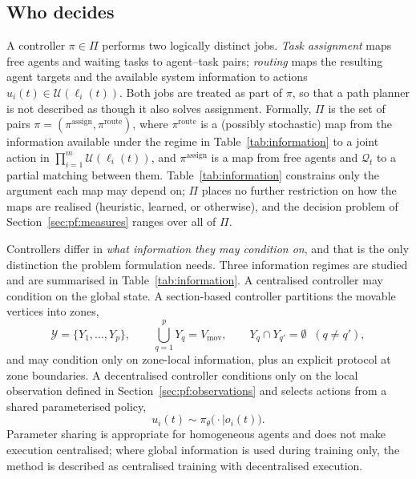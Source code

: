\documentclass[../main.tex]{subfiles}
\begin{document}
\subsection{Who decides}
\label{sec:pf:controllers}

A controller $\pi \in \Pi$ performs two logically distinct jobs. \emph{Task
assignment} maps free agents and waiting tasks to agent--task pairs; \emph{routing}
maps the resulting agent targets and the available system information to actions
$u_i(t) \in \mathcal{U}(\ell_i(t))$. Both jobs are treated as part of $\pi$, so
that a path planner is not described as though it also solves assignment.
Formally, $\Pi$ is the set of pairs %
$\pi = (\pi^{\mathrm{assign}}, \pi^{\mathrm{route}})$, where
$\pi^{\mathrm{route}}$ is a (possibly stochastic) map from the information
available under the regime in Table~\ref{tab:information} to a joint action in
$\prod_{i=1}^m \mathcal{U}(\ell_i(t))$, and $\pi^{\mathrm{assign}}$ is a map from
free agents and $\mathcal{Q}_t$ to a partial matching between them.
Table~\ref{tab:information} constrains only the argument each map may depend on;
$\Pi$ places no further restriction on how the maps are realised (heuristic,
learned, or otherwise), and the decision problem of
Section~\ref{sec:pf:measures} ranges over all of $\Pi$.

Controllers differ in \emph{what information they may condition on}, and that is
the only distinction the problem formulation needs. Three information regimes are
studied and are summarised in Table~\ref{tab:information}. A centralised
controller may condition on the global state. A section-based controller
partitions the movable vertices into zones,
\begin{equation}
  \mathcal{Y} = \{Y_1,\dots,Y_p\}, \qquad
  \bigcup_{q=1}^{p} Y_q = V_{\mathrm{mov}}, \qquad
  Y_q \cap Y_{q'} = \emptyset \;\; (q \neq q'),
  \label{eq:partition}
\end{equation}
and may condition only on zone-local information, plus an explicit protocol at
zone boundaries. A decentralised controller conditions only on the local
observation defined in Section~\ref{sec:pf:observations} and selects actions from
a shared parameterised policy,
\[
  u_i(t) \sim \pi_\theta\bigl(\cdot \mid o_i(t)\bigr).
\]
Parameter sharing is appropriate for homogeneous agents and does not make
execution centralised; where global information is used during training only, the
method is described as centralised training with decentralised execution.
\end{document}
